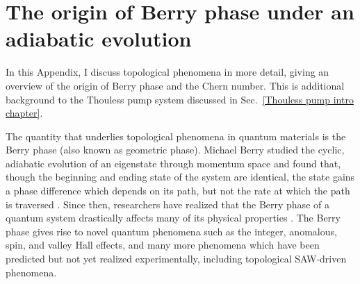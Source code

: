 \documentclass{beavtex_dub_edit}
\begin{document}








\chapter{The origin of Berry phase under an adiabatic evolution} \label{appendix on topology}

In this Appendix, I discuss topological phenomena in more detail, giving an overview of the origin of Berry phase and the Chern number. This is additional background to the Thouless pump system discussed in Sec.\ \ref{Thouless pump intro chapter}.

The quantity that underlies topological phenomena in quantum materials is the Berry phase (also known as geometric phase). Michael Berry studied the cyclic, adiabatic evolution of an eigenstate through momentum space and found that, though the beginning and ending state of the system are identical, the state gains a phase difference which depends on its path, but not the rate at which the path is traversed \cite{berry_quantal_1984}. Since then, researchers have realized that the Berry phase of a quantum system drastically affects many of its physical properties \cite{xiao_berry_2010}. The Berry phase gives rise to novel quantum phenomena such as the integer, anomalous, spin, and valley Hall effects, and many more phenomena which have been predicted but not yet realized experimentally, including topological SAW-driven phenomena. 
\end{document}
